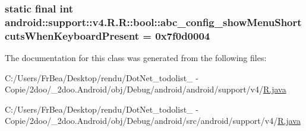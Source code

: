 \hypertarget{classandroid_1_1support_1_1v4_1_1_r_1_1bool_f87bda79c26a642dabd3b6b20c4e7af4}{
\subsubsection[{abc\_\-config\_\-showMenuShortcutsWhenKeyboardPresent}]{\setlength{\rightskip}{0pt plus 5cm}static final int android::support::v4.R.R::bool::abc\_\-config\_\-showMenuShortcutsWhenKeyboardPresent = 0x7f0d0004}}
\label{classandroid_1_1support_1_1v4_1_1_r_1_1bool_f87bda79c26a642dabd3b6b20c4e7af4}




The documentation for this class was generated from the following files:\begin{CompactItemize}
\item 
C:/Users/FrBea/Desktop/rendu/DotNet\_\-todolist\_ - Copie/2doo/\_\-2doo.Android/obj/Debug/android/android/support/v4/\hyperlink{android_2support_2v4_2_r_8java}{R.java}\item 
C:/Users/FrBea/Desktop/rendu/DotNet\_\-todolist\_ - Copie/2doo/\_\-2doo.Android/obj/Debug/android/src/android/support/v4/\hyperlink{src_2android_2support_2v4_2_r_8java}{R.java}\end{CompactItemize}

